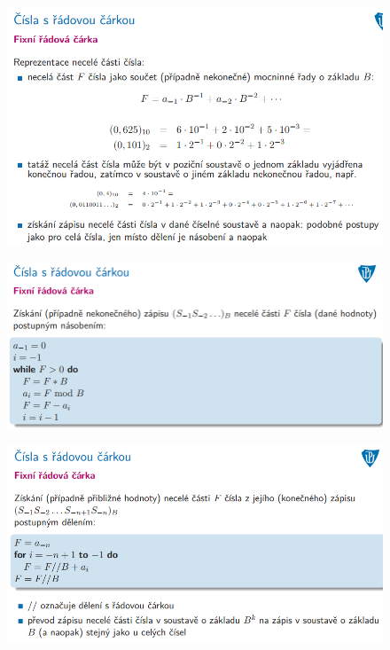 \documentclass[10pt,a4paper]{article}
\begin{document}
\begin{figure} [h]
	\includegraphics[scale=0.65]{img/prvni_odstavec/otazka3/cisla_s_radovou_carkou2.png}	
\end{figure}

\begin{figure} [h]
	\includegraphics[scale=0.65]{img/prvni_odstavec/otazka3/cisla_s_radovou_carkou3.png}	
\end{figure}

\begin{figure} [h]
	\includegraphics[scale=0.65]{img/prvni_odstavec/otazka3/cisla_s_radovou_carkou4.png}	
\end{figure}
\end{document}
